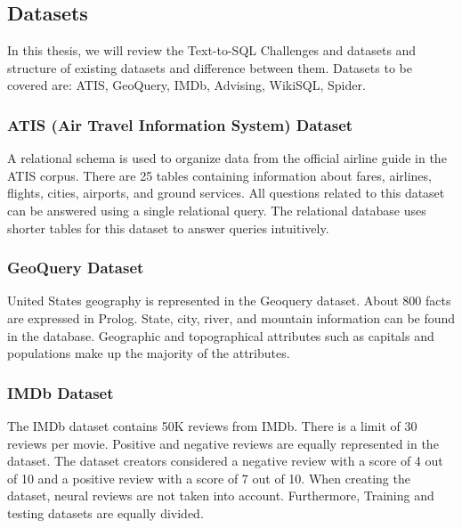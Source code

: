 \subsection{Datasets}

In this thesis, we will review the Text-to-SQL Challenges and datasets and structure of existing datasets and difference between them. Datasets to be covered are: ATIS, GeoQuery, IMDb, Advising, WikiSQL, Spider.

\subsubsection*{ATIS (Air Travel Information System) Dataset}

A relational schema is used to organize data from the official airline guide in the ATIS corpus. There are 25 tables containing information about fares, airlines, flights, cities, airports, and ground services. All questions related to this dataset can be answered using a single relational query. The relational database uses shorter tables for this dataset to answer queries intuitively.


\subsubsection*{GeoQuery Dataset}

United States geography is represented in the Geoquery dataset. About 800 facts are expressed in Prolog. State, city, river, and mountain information can be found in the database. Geographic and topographical attributes such as capitals and populations make up the majority of the attributes.

\subsubsection*{IMDb Dataset}

The IMDb dataset contains 50K reviews from IMDb. There is a limit of 30 reviews per movie\cite{maas-EtAl:2011:ACL-HLT2011}. Positive and negative reviews are equally represented in the dataset. The dataset creators considered a negative review with a score of 4 out of 10 and a positive review with a score of 7 out of 10. When creating the dataset, neural reviews are not taken into account. Furthermore, Training and testing datasets are equally divided.

